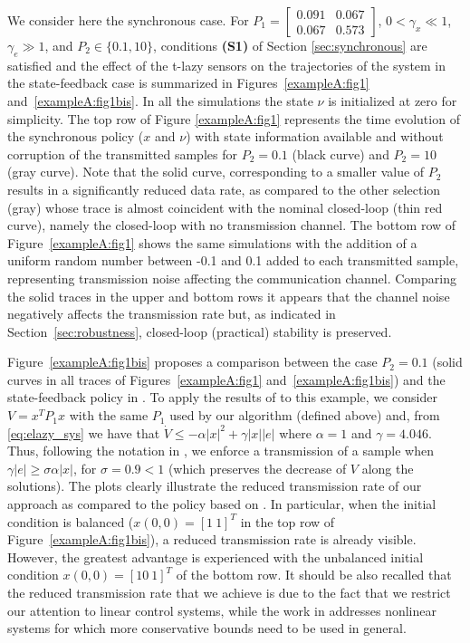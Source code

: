 \documentclass[twocolumn]{autart}
\newcommand{\smallmat}[1]{\left[ \begin{smallmatrix}#1
    \end{smallmatrix} \right]}
\begin{document}
{

We consider here the synchronous case. For
$P_1 = \smallmat{ 0.091 & 0.067 \\ 0.067 &   0.573}$, $0< \gamma_x \ll 1$,
$\gamma_e \gg 1$, and $P_2 \in \{0.1, 10\}$, conditions \textbf{(S1)} of 
Section \ref{sec:synchronous} are satisfied and the effect of the t-lazy sensors
on the trajectories of the system in the state-feedback case 
is summarized in Figures~\ref{exampleA:fig1}
and~\ref{exampleA:fig1bis}. 
In all the simulations the state $\nu$ is initialized at zero for simplicity.
The top row
of Figure \ref{exampleA:fig1} represents the time evolution of the
synchronous policy ($x$ and $\nu$) with state information available and
without corruption of the transmitted samples for $P_2 =0.1$ (black curve) and $P_2 =10$ (gray curve).
Note that the solid curve, corresponding to a smaller value of $P_2$
results in a significantly reduced data rate, as compared to the other
selection (gray) whose trace is almost coincident with the nominal
closed-loop (thin red curve), namely the closed-loop with no transmission
channel. 
The bottom row of Figure~\ref{exampleA:fig1} shows the same
simulations
with the addition of a 
uniform random number between -0.1 and 0.1 added to
 each transmitted sample, representing transmission noise affecting
 the communication channel.
Comparing the solid traces in the upper and bottom rows it appears
that the channel noise negatively affects the transmission rate but,
as indicated in Section~\ref{sec:robustness}, closed-loop (practical) stability is preserved.

Figure~\ref{exampleA:fig1bis}
 proposes a comparison between the case 
$P_2 = 0.1$ (solid curves in all traces of Figures~\ref{exampleA:fig1} and~\ref{exampleA:fig1bis}) 
and the state-feedback policy in \cite{Tabuada07}.
To apply the results of \cite{Tabuada07} to this
example, we consider $V = x^T P_1 x$ with the same $P_1$ used by our
algorithm (defined above) and, from 
\eqref{eq:elazy_sys} we have that
$\dot{V} \leq -\alpha |x|^2 + \gamma |x||e|$
where $\alpha = 1$ and $ \gamma = 4.046$. Thus, following the notation in
\cite[Equation (8)]{Tabuada07}, we enforce a transmission of a sample
when $\gamma |e| \geq \sigma \alpha|x|$, for $\sigma = 0.9 < 1$
(which preserves
the decrease of $V$ along the solutions).
The plots clearly illustrate the reduced transmission rate of our approach as compared to
the policy based on \cite[Equation (8)]{Tabuada07}.
In particular, when the initial condition is balanced ($x(0,0) = [1\
1]^T$
in the top row of Figure~\ref{exampleA:fig1bis}), a reduced
transmission rate is already visible. However, the greatest advantage
is experienced with the unbalanced initial condition $x(0,0) = [10\
1]^T$ of the bottom row.
It should be also recalled that the reduced transmission rate that we
achieve is due to the fact that we restrict our attention to linear
control systems, while the work in \cite{Tabuada07} addresses
nonlinear systems for which more conservative bounds need to be used
in general.

}
\end{document}
